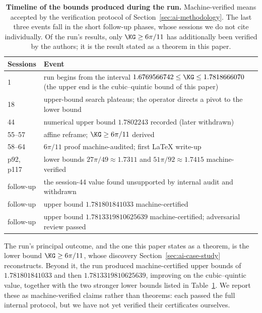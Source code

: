 \begin{table}[t]
\centering
\small
\begin{tabular}{@{}lp{}@{}}
\toprule
Sessions & Event\\
\midrule
1 & run begins from the interval $1.6769566742\le\KG\le1.7818666070$
(the upper end is the cubic--quintic bound of this paper)\\
18 & upper-bound search plateaus; the operator directs a pivot to the
lower bound\\
44 & numerical upper bound $1.7802243$ recorded (later withdrawn)\\
55--57 & affine reframe; $\KG\ge6\pi/11$ derived\\
58--64 & $6\pi/11$ proof machine-audited; first \LaTeX{} write-up\\
p92, p117 & lower bounds $27\pi/49\approx1.7311$ and
$51\pi/92\approx1.7415$ machine-verified\\
follow-up & the session-44 value found unsupported by internal audit and
withdrawn\\
follow-up & upper bound $1.781801841033$ machine-certified\\
follow-up & upper bound $1.7813319810625639$ machine-certified;
adversarial review passed\\
\bottomrule
\end{tabular}
\caption{\textbf{Timeline of the bounds produced during the run.}
Machine-verified means accepted by the verification protocol of
Section~\ref{sec:ai-methodology}. The last three events fall in the short
follow-up phases, whose sessions we do not cite individually. Of the
run's results, only $\KG\ge6\pi/11$ has additionally been verified by the
authors; it is the result stated as a theorem in this paper.}
\label{tab:timeline}
\end{table}

The run's principal outcome, and the one this paper states as a theorem,
is the lower bound $\KG\ge6\pi/11$, whose discovery
Section~\ref{sec:ai-case-study} reconstructs. Beyond it, the run produced
machine-certified upper bounds of $1.781801841033$ and then
$1.7813319810625639$, improving on the cubic--quintic value, together with
the two stronger lower bounds listed in Table~\ref{tab:timeline}. We
report these as machine-verified claims rather than theorems: each passed
the full internal protocol, but we have not yet verified their
certificates ourselves.

